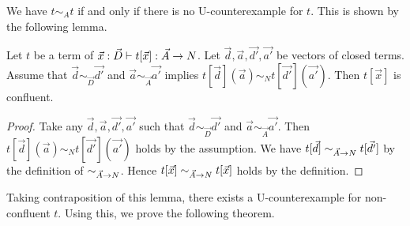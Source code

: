 We have $t \sim_A t$ if and only if there is no U-counterexample for $t$.
This is shown by the following lemma.
\begin{lemma}\label{lem:uniq_value}
  Let $t$ be a term of $\vec{x}:\vec{D} \vdash t[\vec{x}]:\vec{A}\rightarrow{N}$. 
  Let $\vec{d},\vec{a},\vec{d'},\vec{a'}$ be vectors of closed terms.
  Assume that
  $\vec{d}\sim_{\vec{D}}\vec{d'}$ and $\vec{a}\sim_{\vec{A}}\vec{a'}$ implies $t[\vec{d}](\vec{a}) \sim_N t[\vec{d'}](\vec{a'})$. 
  Then $t[\vec{x}]$ is confluent. 
\end{lemma}
\begin{proof}
  Take any $\vec{d},\vec{a},\vec{d'},\vec{a'}$ such that $\vec{d}\sim_{\vec{D}}\vec{d'}$ and $\vec{a}\sim_{\vec{A}}\vec{a'}$.
  Then $t[\vec{d}](\vec{a}) \sim_N t[\vec{d'}](\vec{a'})$ holds by the assumption.
  We have $t[\vec{d}] \sim_{\vec{A}\rightarrow{N}} t[\vec{d'}]$ by the definition of $\sim_{\vec{A}\rightarrow{N}}$.
  Hence $t[\vec{x}] \sim_{\vec{A}\rightarrow{N}} t[\vec{x}]$ holds by the definition. 
\end{proof}

Taking contraposition of this lemma, there exists a U-counterexample for non-confluent $t$. 
Using this, we prove the following theorem.

